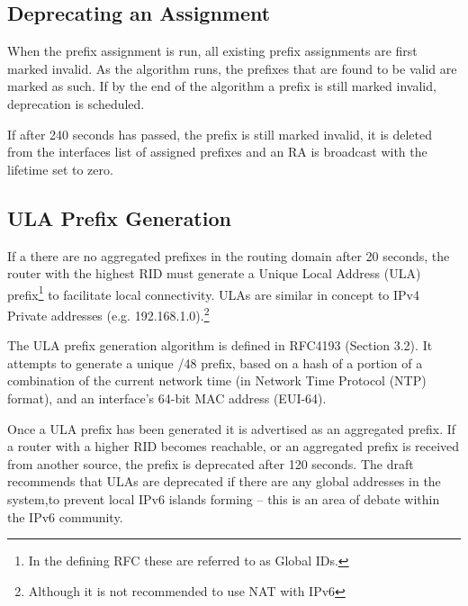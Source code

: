 \subsection{Deprecating an Assignment}
When the prefix assignment is run, all existing prefix assignments are first
marked invalid. As the algorithm runs, the prefixes that are found to be valid
are marked as such. If by the end of the algorithm a prefix is still marked
invalid, deprecation is scheduled. 

If after 240 seconds has passed, the prefix is still marked invalid, it is
deleted from the interfaces list of assigned prefixes and an RA is broadcast
with the lifetime set to zero. 

\subsection{ULA Prefix Generation}
If a there are no aggregated prefixes in the routing domain after 20 seconds,
the router with the highest RID must generate a Unique Local Address
(ULA) prefix\footnote{In the defining
RFC these are referred to as Global IDs.} to facilitate local connectivity.
ULAs are similar in concept to IPv4 Private addresses (e.g.
192.168.1.0).\footnote{Although it is not recommended to use NAT with IPv6}

The ULA prefix generation algorithm is defined in RFC4193 (Section
3.2)\cite{rfc4193}. It attempts to generate a unique /48 prefix, based on a
hash of a portion of a combination of the current network time (in Network Time
Protocol (NTP)  format), and an
interface's 64-bit MAC address (EUI-64).

Once a ULA prefix has been generated it is advertised as an aggregated prefix.
If a router with a higher RID becomes reachable, or an aggregated prefix is
received from another source, the prefix is deprecated after 120 seconds. The
draft recommends that ULAs are deprecated if there are any global addresses in
the system,to prevent local IPv6 islands forming -- this is an area of debate
within the IPv6 community. 

